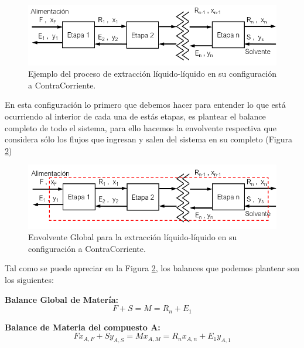\documentclass[11pt]{book}
\begin{document}
\begin{figure}[H]
    \centering
    \includegraphics{img/LiquidoLiquido/ExtraccionLiqLiq_ContraCorriente_1.PNG}
    \caption{Ejemplo del proceso de extracción líquido-líquido en su configuración a ContraCorriente.}
    \label{fig:ExtraccionLiqLiqContraCorriente_1}
\end{figure}

En esta configuración lo primero que debemos hacer para entender lo que está ocurriendo al interior de cada una de estás etapas, es plantear el balance completo de todo el sistema, para ello hacemos la envolvente respectiva que considera sólo los flujos que ingresan y salen del sistema en su completo (Figura \ref{fig:ExtraccionLiqLiqContraCorriente_2})

\begin{figure}[H]
    \centering
    \includegraphics{img/LiquidoLiquido/ExtraccionLiqLiq_ContraCorriente_2.PNG}
    \caption{Envolvente Global para la extracción líquido-líquido en su configuración a ContraCorriente.}
    \label{fig:ExtraccionLiqLiqContraCorriente_2}
\end{figure}

Tal como se puede apreciar en la Figura \ref{fig:ExtraccionLiqLiqContraCorriente_2}, los balances que podemos plantear son los siguientes:

\textbf{Balance Global de Matería:}
\begin{equation}
    \label{eq:ExtraccionLiqLiqContracorriente_1}
    F + S = M = R_n + E_1 
\end{equation}

\textbf{Balance de Materia del compuesto A:}
\begin{equation}
    \label{eq:ExtraccionLiqLiqContracorriente_2}
   F x_{A,F} + S y_{A,S} = M x_{A,M} = R_n x_{A,n} + E_1 y_{A,1}
\end{equation}
\end{document}
